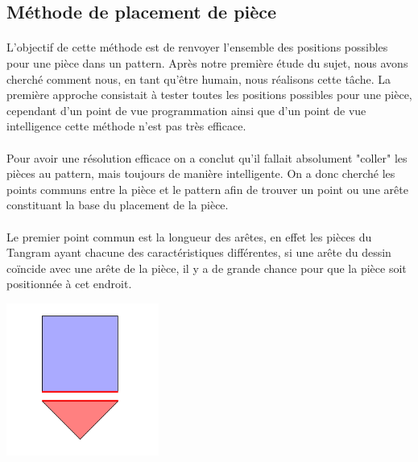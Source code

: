 \documentclass{report}
\begin{document}
\subsection{Méthode de placement de pièce}

    \paragraph{}L'objectif de cette méthode est de renvoyer l'ensemble des positions possibles pour
    une pièce dans un pattern. Après notre première étude du sujet, nous avons cherché comment nous,
    en tant qu'être humain, nous réalisons cette tâche.  La première approche consistait à tester
    toutes les positions possibles pour une pièce, cependant d'un point de vue programmation ainsi
    que d'un point de vue intelligence cette méthode n'est pas très efficace. 

    \paragraph{} Pour avoir une résolution efficace on a conclut qu'il fallait absolument "coller" 
    les pièces au pattern, mais toujours de manière intelligente. On a donc cherché les points 
    communs entre la pièce et le pattern afin de trouver un point ou une arête constituant la base 
    du placement de la pièce. 
    
    \paragraph{}Le premier point commun est la longueur des arêtes, en effet les pièces du Tangram
    ayant chacune des caractéristiques différentes, si une arête du dessin coïncide avec une arête
    de la pièce, il y a de grande chance pour que la pièce soit positionnée à cet endroit. 
    
    \begin{center}
    \includegraphics[width=5cm]{place_figure_exacte_match}
    \end{center}
\end{document}
